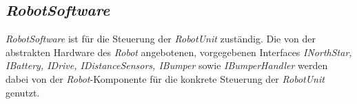 \subsection{\textit{RobotSoftware}}

\emph{RobotSoftware} ist für die Steuerung der \textit{RobotUnit} zuständig. 
Die von der abstrakten Hardware
des \textit{Robot} angebotenen, vorgegebenen Interfaces \textit{INorthStar, IBattery, IDrive, IDistanceSensors, IBumper} sowie
\textit{IBumperHandler} werden dabei von der \textit{Robot}-Komponente für die konkrete Steuerung der \textit{RobotUnit} genutzt.

